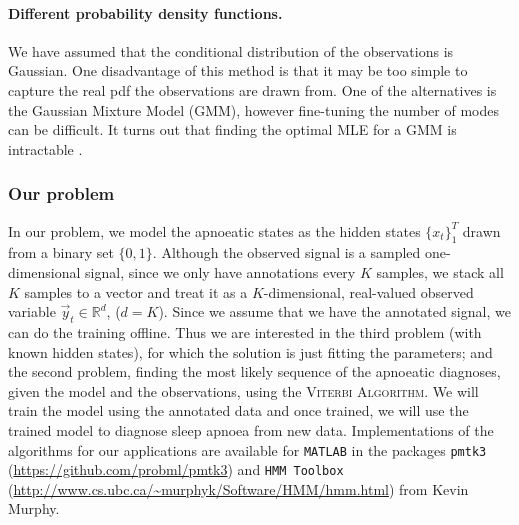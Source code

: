 	\paragraph{Different probability density functions.}
	We have assumed that the conditional distribution of the observations is Gaussian. One disadvantage of this method is that it may be too simple to capture the real pdf the observations are drawn from. One of the alternatives is the Gaussian Mixture Model (GMM), however fine-tuning the number of modes can be difficult. It turns out that finding the optimal MLE for a GMM is intractable \cite{mlBook}.
	
\subsubsection{Our problem}
	In our problem, we model the apnoeatic states as the hidden states $\{x_t\}_1^T$ drawn from a binary set $\{0, 1\}$. Although the observed signal is a sampled one-dimensional signal, since we only have annotations every $K$ samples, we stack all $K$ samples to a vector and treat it as a $K$-dimensional, real-valued observed variable $\vec y_t \in \mathbb{R}^d$, ($d = K$). Since we assume that we have the annotated signal, we can do the training offline. Thus we are interested in the third problem (with known hidden states), for which the solution is just fitting the parameters; and the second problem, finding the most likely sequence of the apnoeatic diagnoses, given the model and the observations, using the \textsc{Viterbi Algorithm}. We will train the model using the annotated data and once trained, we will use the trained model to diagnose sleep apnoea from new data. Implementations of the algorithms for our applications are available for \verb!MATLAB!\textsuperscript{\textregistered} in the packages \verb!pmtk3! (\url{https://github.com/probml/pmtk3}) and \verb!HMM Toolbox! (\url{http://www.cs.ubc.ca/~murphyk/Software/HMM/hmm.html}) from Kevin Murphy.